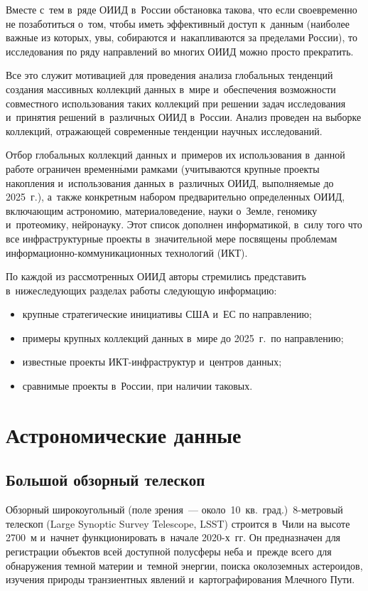 \begin{multicols}{2}
  Вместе с~тем в~ряде ОИИД в~России обстановка такова, что если своевременно не 
позаботиться о~том, чтобы иметь эффективный доступ к~данным (наиболее важные из 
которых, увы, собираются и~накапливаются за пределами России), то исследования по 
ряду направлений во многих ОИИД можно просто прекратить.
  
  Все это служит мотивацией для проведения анализа глобальных тенденций создания 
массивных коллекций данных в~мире и~обеспечения возможности совместного 
использования таких коллекций при решении задач исследования и~принятия решений 
в~различных ОИИД в~России. Анализ проведен на выборке коллекций, отражающей 
современные тенденции научных исследований.
  
  Отбор глобальных коллекций данных и~примеров их использования в~данной работе 
ограничен временн$\acute{\mbox{ы}}$ми рамками (учитываются крупные проекты накопления 
и~использования данных в~различных ОИИД, выполняемые до 2025~г.), а~так\-же 
конкретным набором предварительно определенных ОИИД, включающим астрономию, 
материаловедение, науки о~Земле, геномику и~протеомику, нейронауку. Этот список 
дополнен информатикой, в~силу того что все инфраструктурные проекты в~значительной 
мере посвящены проб\-ле\-мам ин\-фор\-ма\-ци\-он\-но-ком\-му\-ни\-ка\-ци\-он\-ных 
технологий (ИКТ).
  
  По каждой из рассмотренных ОИИД авторы стремились представить в~нижеследующих 
разделах работы следующую информацию:
  \begin{itemize}
\item крупные стратегические инициативы США и~ЕС по направлению;
\item примеры крупных коллекций данных в~мире до 2025~г.\ по направлению;
\item известные проекты ИКТ-инфраструктур и~центров данных;
\item сравнимые проекты в~России, при наличии таковых.
\end{itemize}

\section{Астрономические данные}

\subsection{Большой обзорный телескоп}

  Обзорный широкоугольный (поле зрения~--- около~10~кв.\ град.)\ 8-мет\-ро\-вый 
телескоп  (Large Synoptic Survey Telescope, LSST) строится в~Чили на высоте 2700~м 
и~начнет функционировать в~начале  
2020-х~гг. Он предназначен для регистрации объектов всей доступной полусферы неба 
и~прежде всего для обнаружения темной материи и~темной энергии, поиска околоземных 
астероидов, изучения природы транзиентных явлений и~картографирования Млечного 
Пути.
  

\end{multicols}
